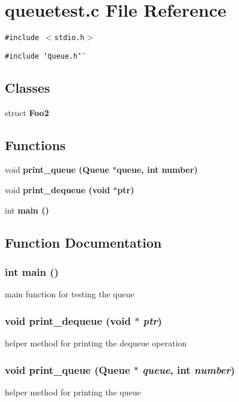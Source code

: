 \section{queuetest.c File Reference}
\label{queuetest_8c}
{\tt \#include $<$stdio.h$>$}\par
{\tt \#include \char`\"{}queue.h\char`\"{}}\par
\subsection*{Classes}
\begin{CompactItemize}
\item 
struct \bf{Foo2}
\end{CompactItemize}
\subsection*{Functions}
\begin{CompactItemize}
\item 
void \bf{print\_\-queue} (\bf{Queue} $\ast$queue, int number)
\item 
void \bf{print\_\-dequeue} (void $\ast$ptr)
\item 
int \bf{main} ()
\end{CompactItemize}


\subsection{Function Documentation}
\subsubsection{\setlength{\rightskip}{0pt plus 5cm}int main ()}\label{queuetest_8c_e66f6b31b5ad750f1fe042a706a4e3d4}


main function for testing the queue 
\subsubsection{\setlength{\rightskip}{0pt plus 5cm}void print\_\-dequeue (void $\ast$ {\em ptr})}\label{queuetest_8c_87c22f453f6c853c48da2b90d84b6c06}


helper method for printing the dequeue operation 
\subsubsection{\setlength{\rightskip}{0pt plus 5cm}void print\_\-queue (\bf{Queue} $\ast$ {\em queue}, int {\em number})}\label{queuetest_8c_ba8d8707256f41ebef60c414bcf8fdd4}


helper method for printing the queue 